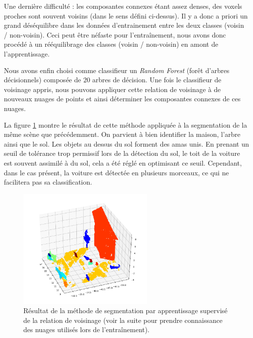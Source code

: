 \documentclass[a4paper, onecolumn, 11pt]{article}
\begin{document}
Une dernière difficulté : les composantes connexes étant assez denses, des voxels proches sont souvent voisins (dans le sens défini ci-dessus).  Il y a donc a priori un grand déséquilibre dans les données d'entrainement entre les deux classes (voisin / non-voisin). Ceci peut être néfaste pour l'entraînement, nous avons donc procédé à un rééquilibrage des classes (voisin / non-voisin) en amont de l'apprentissage. 

Nous avons enfin choisi comme classifieur un \emph{Random Forest} (forêt d'arbres décisionnels) composée de $20$ arbres de décision. Une fois le classifieur de voisinage appris, nous pouvons appliquer cette relation de voisinage à de nouveaux nuages de points et ainsi déterminer les composantes connexes de ces nuages.

La figure \ref{fig:resultat-segmentation-supervisee} montre le résultat de cette méthode appliquée à la segmentation de la même scène que précédemment. On parvient à bien identifier la maison, l'arbre ainsi que le sol. Les objets au dessus du sol forment des amas unis. En prenant un seuil de tolérance trop permissif lors de la détection du sol, le toit de la voiture est souvent assimilé à du sol, cela a été réglé en optimisant ce seuil. Cependant, dans le cas présent, la voiture est détectée en plusieurs morceaux, ce qui ne facilitera pas sa classification.

\begin{figure}[h]
    \centering
    \includegraphics[width=0.6\textwidth]{fig/fourth_segmentation_supervised.png}
    \caption{Résultat de la méthode de segmentation par apprentissage supervisé de la relation de voisinage (voir la suite pour prendre connaissance des nuages utilisés lors de l'entraînement).}
    \label{fig:resultat-segmentation-supervisee}
\end{figure}
\end{document}
